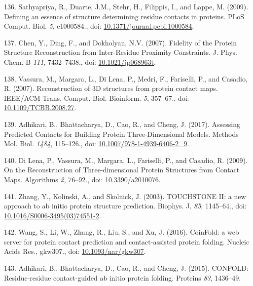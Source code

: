 \documentclass[11pt,a4paper,twoside]{book}
\theoremstyle{definition}
\theoremstyle{definition}
\theoremstyle{remark}
\begin{document}
\hypertarget{ref-Sathyapriya2009}{}
136. Sathyapriya, R., Duarte, J.M., Stehr, H., Filippis, I., and Lappe,
M. (2009). Defining an essence of structure determining residue contacts
in proteins. PLoS Comput. Biol. \emph{5}, e1000584., doi:
\href{https://doi.org/10.1371/journal.pcbi.1000584}{10.1371/journal.pcbi.1000584}.

\hypertarget{ref-Chen2007}{}
137. Chen, Y., Ding, F., and Dokholyan, N.V. (2007). Fidelity of the
Protein Structure Reconstruction from Inter-Residue Proximity
Constraints. J. Phys. Chem. B \emph{111}, 7432--7438., doi:
\href{https://doi.org/10.1021/jp068963t}{10.1021/jp068963t}.

\hypertarget{ref-Vassura2007}{}
138. Vassura, M., Margara, L., Di Lena, P., Medri, F., Fariselli, P.,
and Casadio, R. (2007). Reconstruction of 3D structures from protein
contact maps. IEEE/ACM Trans. Comput. Biol. Bioinform. \emph{5},
357--67., doi:
\href{https://doi.org/10.1109/TCBB.2008.27}{10.1109/TCBB.2008.27}.

\hypertarget{ref-Adhikari2017}{}
139. Adhikari, B., Bhattacharya, D., Cao, R., and Cheng, J. (2017).
Assessing Predicted Contacts for Building Protein Three-Dimensional
Models. Methods Mol. Biol. \emph{1484}, 115--126., doi:
\href{https://doi.org/10.1007/978-1-4939-6406-2_9}{10.1007/978-1-4939-6406-2\_9}.

\hypertarget{ref-DiLena2009a}{}
140. Di Lena, P., Vassura, M., Margara, L., Fariselli, P., and Casadio,
R. (2009). On the Reconstruction of Three-dimensional Protein Structures
from Contact Maps. Algorithms \emph{2}, 76--92., doi:
\href{https://doi.org/10.3390/a2010076}{10.3390/a2010076}.

\hypertarget{ref-Zhang2003}{}
141. Zhang, Y., Kolinski, A., and Skolnick, J. (2003). TOUCHSTONE II: a
new approach to ab initio protein structure prediction. Biophys. J.
\emph{85}, 1145--64., doi:
\href{https://doi.org/10.1016/S0006-3495(03)74551-2}{10.1016/S0006-3495(03)74551-2}.

\hypertarget{ref-Wang2016}{}
142. Wang, S., Li, W., Zhang, R., Liu, S., and Xu, J. (2016). CoinFold:
a web server for protein contact prediction and contact-assisted protein
folding. Nucleic Acids Res., gkw307., doi:
\href{https://doi.org/10.1093/nar/gkw307}{10.1093/nar/gkw307}.

\hypertarget{ref-Adhikari2015a}{}
143. Adhikari, B., Bhattacharya, D., Cao, R., and Cheng, J. (2015).
CONFOLD: Residue-residue contact-guided ab initio protein folding.
Proteins \emph{83}, 1436--49.
\end{document}
